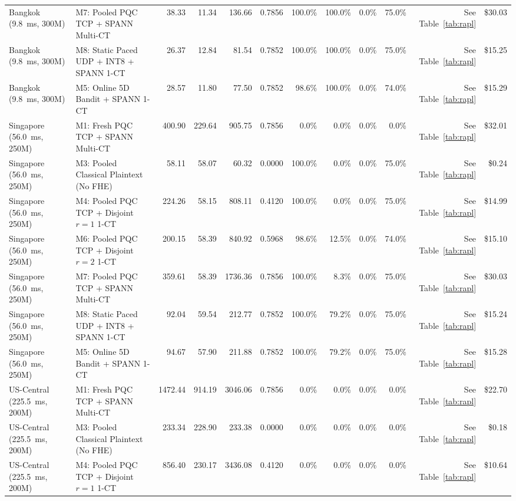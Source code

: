 \begin{table}[t]
{\begin{tabular}{@{}llrrrrrrrrrr@{}}
Bangkok (9.8~ms, 300M) & M7: Pooled PQC TCP + SPANN Multi-CT & 38.33 & 11.34 & 136.66 & 0.7856 & 100.0\% & 100.0\% & 0.0\% & 75.0\% & See Table~\ref{tab:rapl} & \$30.03 \\
Bangkok (9.8~ms, 300M) & M8: Static Paced UDP + INT8 + SPANN 1-CT & 26.37 & 12.84 & 81.54 & 0.7852 & 100.0\% & 100.0\% & 0.0\% & 75.0\% & See Table~\ref{tab:rapl} & \$15.25 \\
Bangkok (9.8~ms, 300M) & M5: Online 5D Bandit + SPANN 1-CT & 28.57 & 11.80 & 77.50 & 0.7852 & 98.6\% & 100.0\% & 0.0\% & 74.0\% & See Table~\ref{tab:rapl} & \$15.29 \\
Singapore (56.0~ms, 250M) & M1: Fresh PQC TCP + SPANN Multi-CT & 400.90 & 229.64 & 905.75 & 0.7856 & 0.0\% & 0.0\% & 0.0\% & 0.0\% & See Table~\ref{tab:rapl} & \$32.01 \\
Singapore (56.0~ms, 250M) & M3: Pooled Classical Plaintext (No FHE) & 58.11 & 58.07 & 60.32 & 0.0000 & 100.0\% & 0.0\% & 0.0\% & 75.0\% & See Table~\ref{tab:rapl} & \$0.24 \\
Singapore (56.0~ms, 250M) & M4: Pooled PQC TCP + Disjoint $r=1$ 1-CT & 224.26 & 58.15 & 808.11 & 0.4120 & 100.0\% & 0.0\% & 0.0\% & 75.0\% & See Table~\ref{tab:rapl} & \$14.99 \\
Singapore (56.0~ms, 250M) & M6: Pooled PQC TCP + Disjoint $r=2$ 1-CT & 200.15 & 58.39 & 840.92 & 0.5968 & 98.6\% & 12.5\% & 0.0\% & 74.0\% & See Table~\ref{tab:rapl} & \$15.10 \\
Singapore (56.0~ms, 250M) & M7: Pooled PQC TCP + SPANN Multi-CT & 359.61 & 58.39 & 1736.36 & 0.7856 & 100.0\% & 8.3\% & 0.0\% & 75.0\% & See Table~\ref{tab:rapl} & \$30.03 \\
Singapore (56.0~ms, 250M) & M8: Static Paced UDP + INT8 + SPANN 1-CT & 92.04 & 59.54 & 212.77 & 0.7852 & 100.0\% & 79.2\% & 0.0\% & 75.0\% & See Table~\ref{tab:rapl} & \$15.24 \\
Singapore (56.0~ms, 250M) & M5: Online 5D Bandit + SPANN 1-CT & 94.67 & 57.90 & 211.88 & 0.7852 & 100.0\% & 79.2\% & 0.0\% & 75.0\% & See Table~\ref{tab:rapl} & \$15.28 \\
US-Central (225.5~ms, 200M) & M1: Fresh PQC TCP + SPANN Multi-CT & 1472.44 & 914.19 & 3046.06 & 0.7856 & 0.0\% & 0.0\% & 0.0\% & 0.0\% & See Table~\ref{tab:rapl} & \$22.70 \\
US-Central (225.5~ms, 200M) & M3: Pooled Classical Plaintext (No FHE) & 233.34 & 228.90 & 233.38 & 0.0000 & 0.0\% & 0.0\% & 0.0\% & 0.0\% & See Table~\ref{tab:rapl} & \$0.18 \\
US-Central (225.5~ms, 200M) & M4: Pooled PQC TCP + Disjoint $r=1$ 1-CT & 856.40 & 230.17 & 3436.08 & 0.4120 & 0.0\% & 0.0\% & 0.0\% & 0.0\% & See Table~\ref{tab:rapl} & \$10.64 \\

\end{tabular}}
\end{table}
